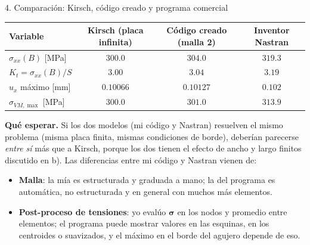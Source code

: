 \begin{desarrollo}{4. Comparaci\'on: Kirsch, c\'odigo creado y programa comercial}

\begin{center}
\renewcommand{\arraystretch}{1.25}
\begin{tabular}{@{}lccc@{}}
\toprule
Variable & Kirsch (placa infinita) & C\'odigo creado (malla 2) & Inventor Nastran\\
\midrule
$\sigma_{xx}(B)$ [MPa] & $300.0$ & $304.0$ & $319.3$\\
$K_t=\sigma_{xx}(B)/S$ & $3.00$ & $3.04$ & $3.19$\\
$u_x$ m\'aximo [mm] & $0.10066$ & $0.10127$ & $0.102$\\
$\sigma_{VM,\max}$ [MPa] & $300.0$ & $301.0$ & $313.9$\\
\bottomrule
\end{tabular}
\end{center}

\textbf{Qu\'e esperar.} Si los dos modelos (mi c\'odigo y Nastran) resuelven el mismo problema
(misma placa finita, mismas condiciones de borde), deber\'ian parecerse
\emph{entre s\'i} m\'as que a Kirsch, porque los dos tienen el efecto de ancho y
largo finitos discutido en b). Las diferencias entre mi c\'odigo y Nastran vienen
de:
\begin{itemize}[itemsep=3pt]
  \item \textbf{Malla}: la m\'ia es estructurada y graduada a mano; la del
  programa es autom\'atica, no estructurada y en general con muchos m\'as
  elementos.
  \item \textbf{Post-proceso de tensiones}: yo eval\'uo $\bm\sigma$ en los nodos
  y promedio entre elementos; el programa puede mostrar valores en las esquinas,
  en los centroides o suavizados, y el m\'aximo en el borde del agujero depende de
  eso.
\end{itemize}


\end{desarrollo}
